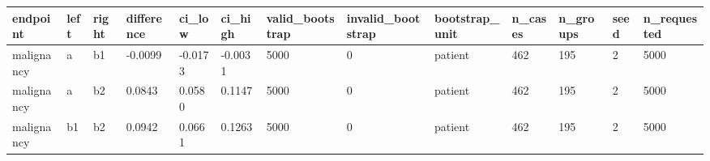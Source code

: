 \begin{tabular}{lllllllllllll}
\hline
endpoint & left & right & difference & ci\_low & ci\_high & valid\_bootstrap & invalid\_bootstrap & bootstrap\_unit & n\_cases & n\_groups & seed & n\_requested \\
\hline
malignancy & a & b1 & -0.0099 & -0.0173 & -0.0031 & 5000 & 0 & patient & 462 & 195 & 2 & 5000 \\
malignancy & a & b2 & 0.0843 & 0.0580 & 0.1147 & 5000 & 0 & patient & 462 & 195 & 2 & 5000 \\
malignancy & b1 & b2 & 0.0942 & 0.0661 & 0.1263 & 5000 & 0 & patient & 462 & 195 & 2 & 5000 \\
\hline
\end{tabular}
